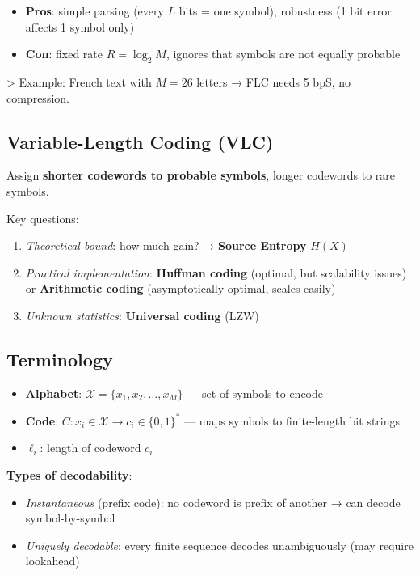 \begin{itemize}
\item \textbf{Pros}: simple parsing (every $L$ bits = one symbol), robustness (1 bit error affects 1 symbol only)
\item \textbf{Con}: fixed rate $R = \log_2 M$, ignores that symbols are not equally probable
\end{itemize}

\textgreater{} Example: French text with $M = 26$ letters → FLC needs 5 bpS, no compression.

\subsection{Variable-Length Coding (VLC)}

Assign \textbf{shorter codewords to probable symbols}, longer codewords to rare symbols.

Key questions:
\begin{enumerate}
\item \textit{Theoretical bound}: how much gain? → \textbf{Source Entropy} $H(X)$
\item \textit{Practical implementation}: \textbf{Huffman coding} (optimal, but scalability issues) or \textbf{Arithmetic coding} (asymptotically optimal, scales easily)
\item \textit{Unknown statistics}: \textbf{Universal coding} (LZW)
\end{enumerate}

\subsection{Terminology}

\begin{itemize}
\item \textbf{Alphabet}: $\mathcal{X} = \{x_1, x_2, \ldots, x_M\}$ — set of symbols to encode
\item \textbf{Code}: $C : x_i \in \mathcal{X} \rightarrow c_i \in \{0, 1\}^*$ — maps symbols to finite-length bit strings
\item $\ell_i$: length of codeword $c_i$
\end{itemize}

\textbf{Types of decodability}:
\begin{itemize}
\item \textit{Instantaneous} (prefix code): no codeword is prefix of another → can decode symbol-by-symbol
\item \textit{Uniquely decodable}: every finite sequence decodes unambiguously (may require lookahead)
\end{itemize}

